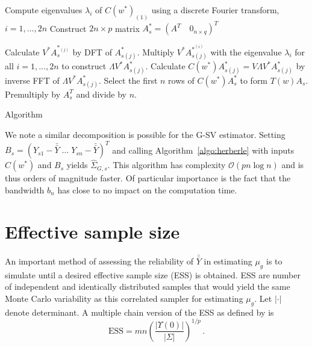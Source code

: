 \documentclass[11pt]{article}
\theoremstyle{remark}
\begin{document}
\begin{algorithm}[htbp] 
\DontPrintSemicolon
\SetAlgoLined
Compute eigenvalues $\lambda_i$ of  $C(w^*)_{(1)}$ using a discrete Fourier transform, $i = 1, \dots, 2n$\;
Construct $2n \times p$ matrix $A^*_s = (A^T  \quad 0_{n \times q})^T$\;

    { 
    Calculate $V^*A_s^{*_{(j)}}$ by DFT of $A^*_{s(j)}$.\;
    Multiply $V^* A_{s(j)}^{*^{(i)}}$ with the eigenvalue $\lambda_i$ for all $i = 1, ..., 2n$ to construct $\Lambda V^* A_{s(j)}^*$.\;
    Calculate $C(w^*)A^*_{s(j)} = V \Lambda V^* A_{s(j)}^*$ by inverse FFT of $\Lambda V^* A_{s(j)}^*$.\;
    }
 Select the first $n$ rows of $C(w^*)A^*_s$ to form $T(w)A_s$.\;
 Premultiply by $A_s^T$ and divide by $n$.\;
 \caption{\cite{heberle2017fast} Algorithm}
 \label{algo:herberle}
\end{algorithm}


We note a similar decomposition is possible for the G-SV estimator. Setting $B_s = (Y_{s1} - \bar{\bar{Y}} \; \dots \; Y_{sn} - \bar{\bar{Y}})^T$ and calling Algorithm~\ref{algo:herberle} with inputs $C(w^*)$ and $B_s$ yields $\hat{\Sigma}_{G,s}$. This algorithm has complexity $\mathcal{O}(p n \log n)$ and is thus orders of magnitude faster. Of particular importance is the fact that the bandwidth $b_n$ has close to no impact on the computation time.

\section{Effective sample size} \label{sec:ess}

An important method of assessing the reliability of $\bar{\bar{Y}}$ in estimating $\mu_g$ is to simulate until a desired effective sample size (ESS) is obtained. ESS are number of independent and identically distributed samples that would yield the same Monte Carlo variability as this correlated sampler for estimating $\mu_g$. Let $|\cdot|$ denote determinant. A multiple chain version of the ESS as defined by \cite{vats2019multivariate} is
\[
\textrm{ESS} = mn \left(\dfrac{|\Upsilon(0)|}{|\Sigma|}\right)^{1/p}\, .
\]
\end{document}
